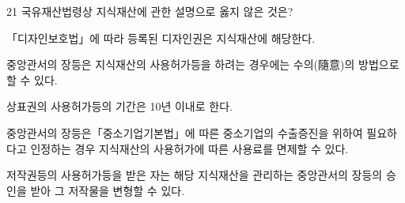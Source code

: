\begin{question}{21}
국유재산법령상 지식재산에 관한 설명으로 옳지 않은 것은?
\begin{choices}
  \item 「디자인보호법」에 따라 등록된 디자인권은 지식재산에 해당한다.
  \item 중앙관서의 장등은 지식재산의 사용허가등을 하려는 경우에는 수의(隨意)의 방법으로 할 수 있다.
  \item 상표권의 사용허가등의 기간은 10년 이내로 한다.
  \item 중앙관서의 장등은「중소기업기본법」에 따른 중소기업의 수출증진을 위하여 필요하다고 인정하는 경우 지식재산의 사용허가에 따른 사용료를 면제할 수 있다.
  \item 저작권등의 사용허가등을 받은 자는 해당 지식재산을 관리하는 중앙관서의 장등의 승인을 받아 그 저작물을 변형할 수 있다.
\end{choices}
\end{question}
